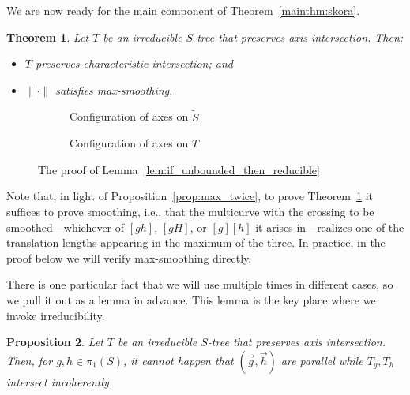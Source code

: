 \documentclass[11pt]{amsart}
\newcommand{\ora}[1]{\overrightarrow{#1}}
\newcommand*{\svgfignormal}[1]{\fontsize{9pt}{9pt}\selectfont}
\numberwithin{equation}{section}
\numberwithin{figure}{section}
\newtheorem{theorem}{Theorem}[section]
\newtheorem{proposition}[theorem]{Proposition}
\theoremstyle{definition}
\theoremstyle{plain}
\newcommand*{\wt}[1]{\widetilde{#1}}
\begin{document}
We are now ready for the main component of Theorem~\ref{mainthm:skora}.

\begin{theorem}
Let $T$ be an irreducible $S$-tree that preserves axis
intersection. Then:
\begin{itemize}
\item $T$ preserves characteristic intersection; and
\item $\| \cdot \|$ satisfies max-smoothing. 
\end{itemize}
\label{thm:small}
\end{theorem}

\begin{figure}
  \begin{subfigure}[b]{0.45\textwidth}
    \centering
    \svgfignormal{k_crossing}
    \caption{Configuration of axes on $\wt{S}$}
    \label{fig:k_crossing}
  \end{subfigure}
  \hfill
  \begin{subfigure}[b]{0.45\textwidth}
    \centering
    \svgfignormal{tree_k_crossing}
    \caption{Configuration of axes on $T$}
    \label{fig:tree_k_crossing}
  \end{subfigure}
  \caption{The proof of Lemma~\ref{lem:if_unbounded_then_reducible} }
\label{fig:main_k_crossing}
\end{figure}



Note that, in light of Proposition~\ref{prop:max_twice}, to prove
Theorem~\ref{thm:small} it suffices
to prove smoothing, i.e., that the multicurve with the crossing to be
smoothed---whichever of $[gh]$, $[gH]$, or $[g][h]$ it arises
in---realizes one of
the translation lengths appearing in the maximum of the three.
In practice, in the proof below we will verify max-smoothing directly.

There is one particular fact that we will use multiple times in
different cases, so we pull it out as a lemma in advance. This lemma
is the key place where we invoke irreducibility.

\begin{proposition}\label{prop:parallel-incoherent}
  Let $T$ be an irreducible $S$-tree that preserves axis
  intersection. Then, for $g,h \in \pi_1(S)$, it cannot happen that
  $(\ora{g},\ora{h})$ are parallel while $T_g,T_h$ intersect incoherently.
\end{proposition}
\end{document}
